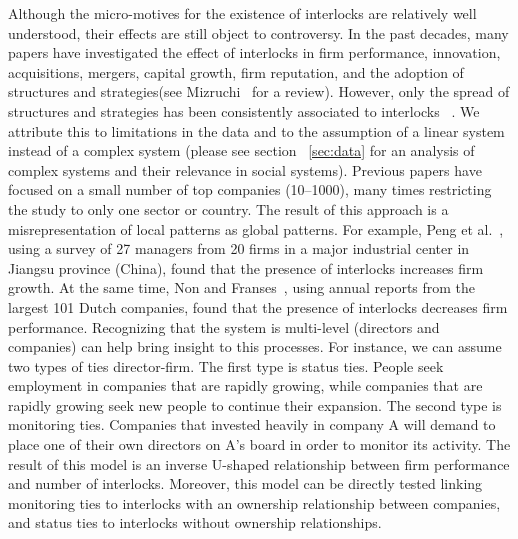 Although the micro-motives for the existence of interlocks are relatively well understood, 
their effects are still object to controversy. 
In the past decades, many papers have investigated the effect of interlocks in firm performance, innovation, acquisitions, mergers, capital growth, firm reputation, and the adoption of structures and strategies(see Mizruchi~\cite{Mizruchi1996} for a review).
However, only the spread of structures and strategies has been consistently associated to interlocks~\citep{Haunschild1993,Davis1997,Davis1991,Rao1999,Shropshire2010} .
We attribute this to limitations in the data and to the assumption of a linear system instead of a complex system (please see section ~\ref{sec:data} for an analysis of complex systems and their relevance in social systems).
Previous papers have focused on a small number of top companies (10--1000), 
many times restricting the study to only one sector or country. 
The result of this approach is a misrepresentation of local patterns as global patterns.
For example, 
Peng et al.~\citep{Peng2016}, using a survey of 27 managers from 20 firms in a major industrial center in Jiangsu province (China), found that the presence of interlocks increases firm growth.
At the same time,
Non and Franses~\citep{franses2007interlocking}, using annual reports from the largest 101 Dutch companies, found that the presence of interlocks decreases firm performance.
Recognizing that the system is multi-level (directors and companies) can help bring insight to this processes.
For instance, we can assume two types of ties director-firm. 
The first type is status ties.
People seek employment in companies that are rapidly growing,
while companies that are rapidly growing seek new people to continue their expansion.
The second type is monitoring ties.
Companies that invested heavily in company A will demand to place one of their own directors on A's board in order to monitor its activity.
The result of this model is an inverse U-shaped relationship between firm performance and number of interlocks.
Moreover, this model can be directly tested linking monitoring ties to interlocks with an ownership relationship between companies, 
and status ties to interlocks without ownership relationships.





